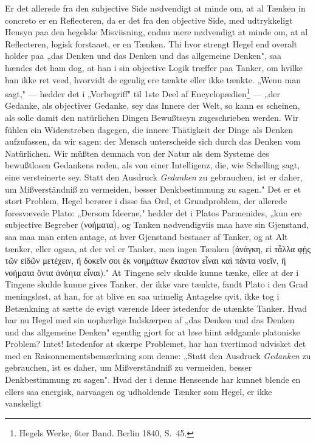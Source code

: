 \documentclass[12pt]{book}
\newcommand{\opage}[1]{\marginnote{\footnotesize\textit{[#1]}}}
\begin{document}
Er det allerede fra den subjective Side nødvendigt at minde om, at al Tænken
in concreto er en Reflecteren, da er det fra den objective Side, med udtrykkeligt
Hensyn paa den hegelske Misviisning, endnu mere nødvendigt at minde om, at al
Reflecteren, logisk forstaaet, er en Tænken. Thi hvor strengt Hegel end overalt
holder paa „das Denken und das Denken und das allgemeine Denken", saa hændes det
ham dog, at han i sin objective Logik træffer paa Tanker, om hvilke han ikke ret
veed, hvorvidt de egenlig ere tænkte eller ikke tænkte. „Wenn man sagt," ---
hedder det i „Vorbegriff" til 1ste Deel af Encyclopædien\footnote{Hegels Werke,
6ter Band. Berlin 1840, S.~45.} --- „der Gedanke, als objectiver Gedanke, sey das
Innere der Welt, so kann es scheinen, als solle damit den natürlichen Dingen
Bewußtseyn zugeschrieben werden. Wir fühlen ein Widerstreben dagegen, die innere
Thätigkeit der Dinge als Denken aufzufassen, da wir sagen:
\opage{58} der Mensch unterscheide sich durch das Denken vom Natürlichen. Wir müßten demnach
von der Natur als dem Systeme des bewußtlosen Gedankens reden, als von einer
Intelligenz, die, wie Schelling sagt, eine versteinerte sey. Statt den Ausdruck
\emph{Gedanken} zu gebrauchen, ist er daher, um Mißverständniß zu vermeiden,
besser Denkbestimmung zu sagen." Det er et stort Problem, Hegel berører i disse
faa Ord, et Grundproblem, der allerede foresvævede Plato: „Dersom Ideerne,"
hedder det i Platos Parmenides, „kun ere subjective Begreber (νοήματα), og Tanken
nødvendigviis maa have sin Gjenstand, saa maa man enten antage, at hver Gjenstand
bestaaer af Tanker, og at Alt tænker, eller ogsaa, at der vel er Tanker, men ingen
Tænken (ἀνάγκη, εἰ τἆλλα φῂς τῶν εἰδῶν μετέχειν, ἢ δοκεῖν σοι ἐκ νοημάτων ἕκαστον
εἶναι καὶ πάντα νοεῖν, ἢ νοήματα ὄντα ἀνόητα εἶναι)." At Tingene selv skulde kunne
tænke, eller at der i Tingene skulde kunne gives Tanker, der ikke vare tænkte,
fandt Plato i den Grad meningsløst, at han, for at blive en saa urimelig Antagelse
qvit, ikke tog i Betænkning at sætte de evigt værende Ideer istedenfor de utænkte
Tanker. Hvad har nu Hegel med sin uophørlige Indskærpen af „das Denken und das
Denken und das allgemeine Denken" egentlig gjort for at løse hiint ældgamle
platoniske Problem? Intet! Istedenfor at skærpe Problemet, har han tvertimod
udvisket det med en Raisonnementsbemærkning som denne: „Statt den Ausdruck
\emph{Gedanken} zu gebrauchen, ist es daher, um Mißverständniß zu vermeiden,
besser Denkbestimmung zu sagen". Hvad der i denne Henseende har kunnet blende en
ellers saa energisk, aarvaagen og udholdende Tænker som Hegel, er ikke vanskeligt
\end{document}
